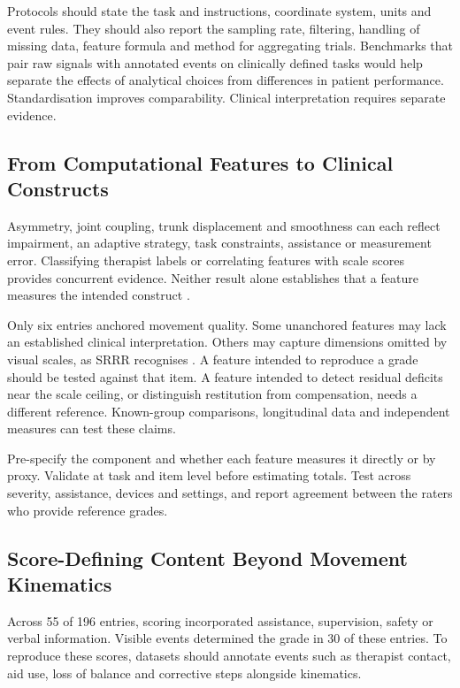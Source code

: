 \documentclass[11pt]{article}
\begin{document}
Protocols should state the task and instructions, coordinate system, units and event rules. They should also report the sampling rate, filtering, handling of missing data, feature formula and method for aggregating trials. Benchmarks that pair raw signals with annotated events on clinically defined tasks would help separate the effects of analytical choices from differences in patient performance. Standardisation improves comparability. Clinical interpretation requires separate evidence.

\subsection{From Computational Features to Clinical Constructs}
\label{sec:constructs}

Asymmetry, joint coupling, trunk displacement and smoothness can each reflect impairment, an adaptive strategy, task constraints, assistance or measurement error. Classifying therapist labels or correlating features with scale scores provides concurrent evidence. Neither result alone establishes that a feature measures the intended construct \cite{Zhi2018CompensationDetection,Lee2021SmartphoneVideoAmbulation,Li2017IMUEMGMotorEvaluation,Grimm2021KinematicValidation}.

Only six entries anchored movement quality. Some unanchored features may lack an established clinical interpretation. Others may capture dimensions omitted by visual scales, as SRRR recognises \cite{CoreKwakkel2019SRRRUpperLimb}. A feature intended to reproduce a grade should be tested against that item. A feature intended to detect residual deficits near the scale ceiling, or distinguish restitution from compensation, needs a different reference. Known-group comparisons, longitudinal data and independent measures can test these claims.

Pre-specify the component and whether each feature measures it directly or by proxy. Validate at task and item level before estimating totals. Test across severity, assistance, devices and settings, and report agreement between the raters who provide reference grades.

\subsection{Score-Defining Content Beyond Movement Kinematics}

Across 55 of 196 entries, scoring incorporated assistance, supervision, safety or verbal information. Visible events determined the grade in 30 of these entries. To reproduce these scores, datasets should annotate events such as therapist contact, aid use, loss of balance and corrective steps alongside kinematics.
\end{document}
